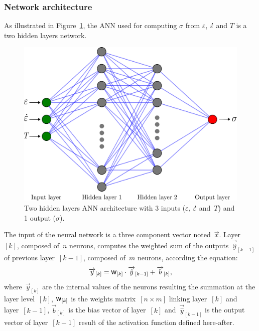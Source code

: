 \documentclass[algorithms,article,submit,pdftex,oneauthors]{Definitions/mdpi}
\DeclareRobustCommand{\w}{\mbox{\large\ensuremath{\mathsf{w}}}}
\DeclareRobustCommand{\lay}[1]{_{[#1]}}
\DeclareRobustCommand{\Lay}[1]{\mbox{$[#1]$}}
\DeclareRobustCommand{\mdot}[1]{\accentset{\mbox{\bfseries .}}{#1}}
\begin{document}
\subsubsection{Network architecture}\label{subsubsec:ANN-arch}

As illustrated in Figure~\ref{fig:ANN-2HL}, the ANN used for computing $\sigma$ from $\varepsilon$, $\mdot{\varepsilon}$ and $T$ is a two hidden layers network.
\begin{figure}[h!]
\centering
\includegraphics[width=0.55\columnwidth]{Figures/ANN-2HL}
\caption{Two hidden layers ANN architecture with 3 inputs ($\varepsilon$, $\mdot{\varepsilon}$ and~$T$) and 1 output ($\sigma$).}
\label{fig:ANN-2HL}
\end{figure}
The input of the neural network is a three component vector noted~$\overrightarrow{x}$.
Layer~\Lay{k}, composed of~$n$ neurons, computes the weighted sum of the outputs~$\overrightarrow{\hat{y}}\lay{k-1}$ of previous layer~\Lay{k-1}, composed of~$m$ neurons, according the equation:
\begin{equation}
\overrightarrow{y}\lay{k} = \w\lay{k} \cdot \overrightarrow{\hat{y}}\lay{k-1}+ \overrightarrow{b}\lay{k}\label{eq:ANN-y},
\end{equation}
where~$\overrightarrow{y}\lay{k}$ are the internal values of the neurons resulting the summation at the layer level~\Lay{k}, $\w\lay{k}$ is the weights matrix~$[n\times m]$ linking layer~\Lay{k} and layer~\Lay{k-1}, $\overrightarrow{b}\lay{k}$ is the bias vector of layer~\Lay{k} and~$\overrightarrow{\hat{y}}\lay{k-1}$ is the output vector of layer~\Lay{k-1} result of the activation function defined here-after.
\end{document}
